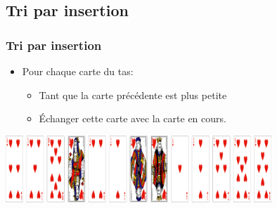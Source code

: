 \documentclass[svgnames,11pt]{beamer}
\begin{document}
\subsection{Tri par insertion}
\begin{frame}
    \frametitle{Tri par insertion}

    \begin{itemize}
        \item Pour chaque carte du tas:
              \begin{itemize}
                  \item Tant que la carte précédente est plus petite
                  \item Échanger cette carte avec la carte en cours.
              \end{itemize}

    \end{itemize}

\end{frame}
\begin{frame}

    \begin{center}
        \centering
        \includegraphics[width=10cm]{ressources/jeu-coeur-melange.png}
    \end{center}
    \begin{center}
    \end{center}

\end{frame}
\end{document}
